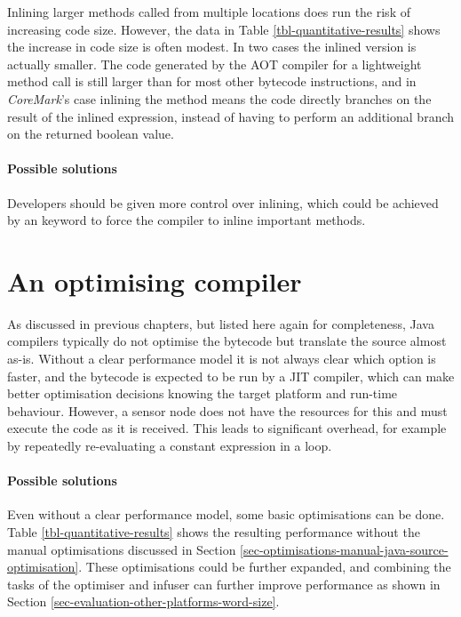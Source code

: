 Inlining larger methods called from multiple locations does run the risk of increasing code size. However, the data in Table \ref{tbl-quantitative-results} shows the increase in code size is often modest. In two cases the inlined version is actually smaller. The code generated by the AOT compiler for a lightweight method call is still larger than for most other bytecode instructions, and in \emph{CoreMark}'s case inlining the  method means the code directly branches on the result of the inlined expression, instead of having to perform an additional branch on the returned boolean value.

\paragraph{Possible solutions}
Developers should be given more control over inlining, which could be achieved by an  keyword to force the compiler to inline important methods.



\section{An optimising compiler}
\label{sec-optimising-javac}
As discussed in previous chapters, but listed here again for completeness, Java compilers typically do not optimise the bytecode but translate the source almost as-is. Without a clear performance model it is not always clear which option is faster, and the bytecode is expected to be run by a JIT compiler, which can make better optimisation decisions knowing the target platform and run-time behaviour. However, a sensor node does not have the resources for this and must execute the code as it is received. This leads to significant overhead, for example by repeatedly re-evaluating a constant expression in a loop.

\paragraph{Possible solutions}
Even without a clear performance model, some basic optimisations can be done. Table \ref{tbl-quantitative-results} shows the resulting performance without the manual optimisations discussed in Section \ref{sec-optimisations-manual-java-source-optimisation}. These optimisations could be further expanded, and combining the tasks of the optimiser and infuser can further improve performance as shown in Section \ref{sec-evaluation-other-platforms-word-size}.




